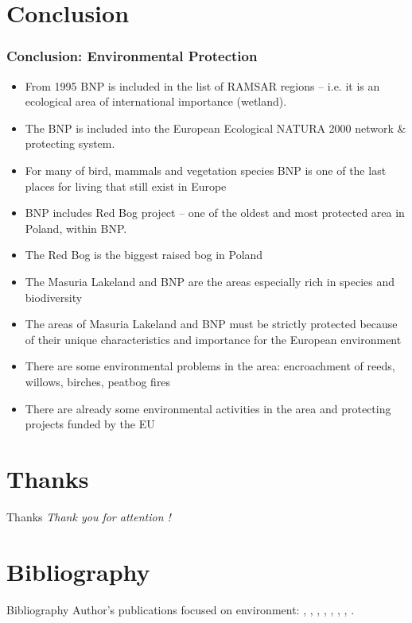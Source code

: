 \documentclass[pdflatex,compress,8pt,
	xcolor={dvipsnames,dvipsnames,svgnames,x11names,table},
	hyperref={colorlinks = true,
	breaklinks = true, urlcolor = NavyBlue, breaklinks = true}]{beamer}
\begin{document}
\section{Conclusion}
\begin{frame}\frametitle{Conclusion: Environmental Protection}
\begin{itemize}
	\item From 1995 BNP is included in the list of RAMSAR regions – i.e. it is an ecological area of international importance (wetland).
	\item The BNP is included into the European Ecological NATURA 2000 network \& protecting system. 
	\item For many of bird, mammals and vegetation species BNP is one of the last places for living that still exist in Europe
	\item BNP includes Red Bog project – one of the oldest and most protected area in Poland, within BNP. 
	\item The Red Bog is the  biggest raised  bog in Poland
	\item The Masuria Lakeland and BNP are the areas especially rich in species and biodiversity
	\item The areas of Masuria Lakeland and BNP must be strictly protected because of their unique characteristics and importance for the European environment
	\item There are some environmental problems in the area: encroachment of reeds, willows, birches, peatbog fires
	\item There are already some environmental activities in the area and protecting projects funded by the EU
\end{itemize}
\end{frame}

\section{Thanks}
\begin{frame}{Thanks}
  	\centering \LARGE 
  	\emph{Thank you for attention !}\\
\end{frame}


\section{Bibliography}
\begin{frame}{Bibliography}
\scriptsize{Author's publications focused on environment: \cite{Lemenkova2006e}, \cite{Lemenkova2006b}, \cite{Lemenkova2006a}, \cite{Lemenkova2007b}, \cite{Lemenkova2004a}, \cite{Lemenkova2008b},  \cite{Lemenkova2005b1}, \cite{Lemenkova2005a}.}

\nocite{*}
\printbibliography[heading=none]

\end{frame}

\end{document}
